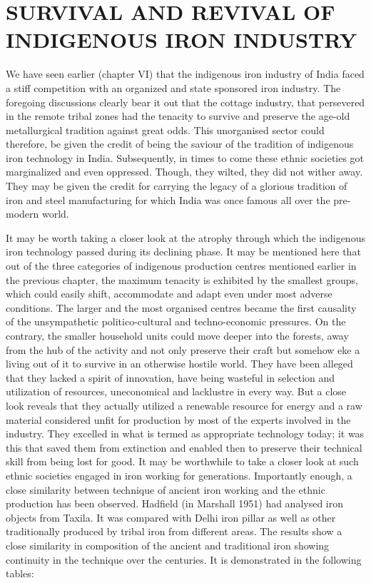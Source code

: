 \chapter{SURVIVAL AND REVIVAL OF INDIGENOUS IRON INDUSTRY}\label{chapter8}

We have seen earlier (chapter VI) that the indigenous iron industry of India faced a stiff competition with an organized and state sponsored iron industry.  The foregoing discussions clearly bear it out that the cottage industry, that persevered in the remote tribal zones had the tenacity to survive and preserve the age-old metallurgical tradition against great odds. This unorganised sector could therefore, be given the credit of being the saviour of the tradition of indigenous iron technology in India. Subsequently, in times to come these ethnic societies got marginalized and even oppressed. Though, they wilted, they did not wither away. They may be given the credit for carrying the legacy of a glorious tradition of iron and steel manufacturing for which India was once famous all over the pre-modern world.

It may be worth taking a closer look at the atrophy through which the indigenous iron technology passed during its declining phase. It may be mentioned here that out of the three categories of indigenous production centres mentioned earlier in the previous chapter, the maximum tenacity is exhibited by the smallest groups, which could easily shift, accommodate and adapt even under most adverse conditions. The larger and the most organised centres became the first causality of the unsympathetic politico-cultural and techno-economic pressures. On the contrary, the smaller household units could move deeper into the forests, away from the hub of the activity and not only preserve their craft but somehow eke a living out of it to survive in an otherwise hostile world. They have been alleged that they lacked a spirit of innovation, have being wasteful in selection and utilization of resources, uneconomical and lacklustre in every way. But a close look reveals that they actually utilized a renewable resource for energy and a raw material considered unfit for production by most of the experts involved in the industry. They excelled in what is termed as appropriate technology today; it was this that saved them from extinction and enabled then to preserve their technical skill from being lost for good. It may be worthwhile to take a closer look at such ethnic societies engaged in iron working for generations. Importantly enough, a close similarity between technique of ancient iron working and the ethnic production has been observed. Hadfield (in Marshall 1951) had analysed iron objects from Taxila. It was compared with Delhi iron pillar as well as other traditionally produced by tribal iron from different areas. The results show a close similarity in composition of the ancient and traditional iron showing continuity in the technique over the centuries. It is demonstrated in the following tables: 

